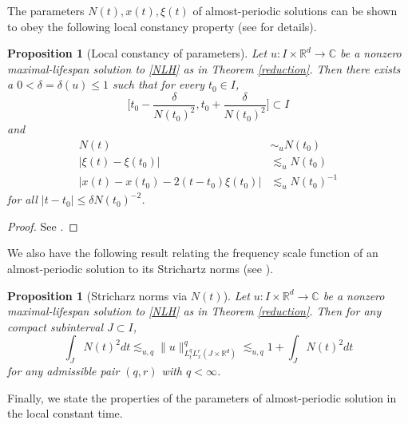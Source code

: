 \documentclass[reqno,11pt]{amsart}
\theoremstyle{plain}
\newtheorem{proposition}[theorem]{Proposition}
\theoremstyle{definition}
\numberwithin{equation}{section}
\numberwithin{theorem}{section}
\def\leq{\leqslant}
\def\R{\mathbb{R}}
\begin{document}
The parameters $N(t),x(t),\xi(t)$ of almost-periodic solutions can be shown to obey the following local constancy property (see \cite{KV} for details).

\begin{proposition}[Local constancy of parameters]
Let $u: I \times \R^d \rightarrow \mathbb{C}$ be a nonzero maximal-lifespan solution to \eqref{NLH} as in Theorem \ref{reduction}. Then there exists a $0<\delta=\delta(u) \leq 1$ such that for every $t_0 \in I$,
\[
\Big[t_0-\frac{\delta}{N(t_0)^2}, t_0+\frac{\delta}{N\left(t_0\right)^2}\Big] \subset I
\]
and
\begin{align*}
N(t) & \sim_u N\left(t_0\right) \\
\left|\xi(t)-\xi\left(t_0\right)\right| & \lesssim_u N\left(t_0\right) \\
\left|x(t)-x\left(t_0\right)-2\left(t-t_0\right) \xi\left(t_0\right)\right| & \lesssim_u N\left(t_0\right)^{-1}
\end{align*}
for all $\left|t-t_0\right| \leq \delta N\left(t_0\right)^{-2}$.
\end{proposition}
\begin{proof}
See \cite{Dodson,KV}.
\end{proof}

We also have the following result relating the frequency scale function of an almost-periodic solution to its Strichartz norms (see \cite{Dodson,KV}).


\begin{proposition}[Stricharz norms via $N(t)$]\label{zzzz}
Let $u: I \times \R^d \rightarrow \mathbb{C}$ be a nonzero maximal-lifespan solution to \eqref{NLH} as in Theorem \ref{reduction}. Then for any compact subinterval $J \subset I$,
\[
    \int_J N(t)^2 d t \lesssim_{u,q}\|u\|_{L_t^{q} L_x^{r}\left(J \times \R^d\right)}^q \lesssim_{u,q} 1+\int_J N(t)^2 d t
    \]
for any admissible pair $(q,r)$ with $q<\infty$.
\end{proposition}


Finally, we state the properties of the parameters of almost-periodic solution in the local constant time.
\end{document}
